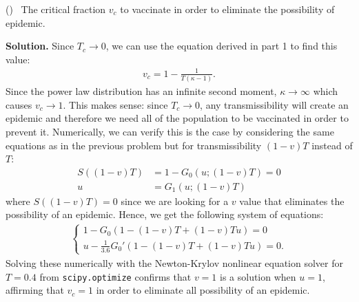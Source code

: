 \documentclass{letter}
\newcounter{problem}
\newcounter{subproblem}[problem]
\newcounter{solution}
\renewcommand{\thesubproblem}{(\alph{subproblem})}
\newcommand{\Subproblem}[1]{%
	\stepcounter{subproblem}%
	\leftskip=15pt%
	\thesubproblem~ #1 \par%
}
\newcommand{\Solution}[1]{%
	\textbf{Solution.} #1 \par%
}
\begin{document}
    \Subproblem{The critical fraction $v_c$ to vaccinate in order to eliminate the possibility of epidemic.}
    \Solution{Since $T_c \rightarrow 0$, we can use the equation derived in part 1 to find this value: \begin{align*}
        v_c = 1 - \frac{1}{T(\kappa - 1)}.
    \end{align*} Since the power law distribution has an infinite second moment, $\kappa \rightarrow \infty$ which causes $v_c \rightarrow 1$. This makes sense: since $T_c \rightarrow 0$, any transmissibility will create an epidemic and therefore we need all of the population to be vaccinated in order to prevent it. Numerically, we can verify this is the case by considering the same equations as in the previous problem but for transmissibility $(1-v)T$ instead of $T$: \begin{align*}
        S((1-v)T) &= 1 - G_0(u; (1-v)T) = 0 \\
        u &= G_1(u; (1-v)T)
    \end{align*} where $S((1-v)T) = 0$ since we are looking for a $v$ value that eliminates the possibility of an epidemic. Hence, we get the following system of equations: \begin{align*}
        \begin{cases} 
            1 - G_0(1 - (1-v)T + (1-v)Tu) = 0 \\
            u - \frac{1}{3.6}G_0'(1 - (1-v)T + (1-v)Tu) = 0.
        \end{cases}
    \end{align*} Solving these numerically with the Newton-Krylov nonlinear equation solver for $T = 0.4$ from \texttt{scipy.optimize} confirms that $v = 1$ is a solution when $u = 1$, affirming that $v_c = 1$ in order to eliminate all possibility of an epidemic.}
\end{document}
